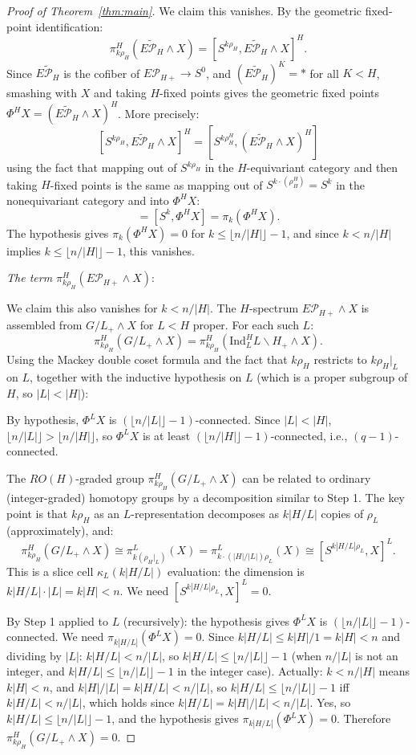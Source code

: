\documentclass[12pt]{article}
\theoremstyle{definition}
\begin{document}
\begin{proof}[Proof of Theorem~\ref{thm:main}]
We claim this vanishes.  By the geometric fixed-point identification:
\[
   \pi_{k\rho_H}^H(\widetilde{E\mathcal{P}_H}\wedge X) = [S^{k\rho_H}, \widetilde{E\mathcal{P}_H}\wedge X]^H.
\]
Since $\widetilde{E\mathcal{P}_H}$ is the cofiber of $E\mathcal{P}_{H+}\to S^0$, and $(\widetilde{E\mathcal{P}_H})^K = *$ for all $K < H$, smashing with $X$ and taking $H$-fixed points gives the geometric fixed points $\Phi^H X = (\widetilde{E\mathcal{P}_H}\wedge X)^H$.  More precisely:
\[
   [S^{k\rho_H}, \widetilde{E\mathcal{P}_H}\wedge X]^H = [S^{k\rho_H^H}, (\widetilde{E\mathcal{P}_H}\wedge X)^H]
\]
using the fact that mapping out of $S^{k\rho_H}$ in the $H$-equivariant category and then taking $H$-fixed points is the same as mapping out of $S^{k\cdot(\rho_H^H)} = S^k$ in the nonequivariant category and into $\Phi^H X$:
\[
   = [S^k, \Phi^H X] = \pi_k(\Phi^H X).
\]
The hypothesis gives $\pi_k(\Phi^H X) = 0$ for $k \leq \lfloor n/|H|\rfloor - 1$, and since $k < n/|H|$ implies $k\leq \lfloor n/|H|\rfloor - 1$, this vanishes.

\noindent\emph{The term $\pi_{k\rho_H}^H(E\mathcal{P}_{H+}\wedge X)$}:

We claim this also vanishes for $k < n/|H|$.  The $H$-spectrum $E\mathcal{P}_{H+}\wedge X$ is assembled from $G/L_+\wedge X$ for $L < H$ proper.  For each such $L$:
\[
   \pi_{k\rho_H}^H(G/L_+\wedge X) = \pi_{k\rho_H}^H(\mathrm{Ind}_L^H L\backslash H_+ \wedge X).
\]
Using the Mackey double coset formula and the fact that $k\rho_H$ restricts to $k\rho_H|_L$ on $L$, together with the inductive hypothesis on $L$ (which is a proper subgroup of $H$, so $|L| < |H|$):

By hypothesis, $\Phi^L X$ is $(\lfloor n/|L|\rfloor - 1)$-connected.  Since $|L| < |H|$, $\lfloor n/|L|\rfloor > \lfloor n/|H|\rfloor$, so $\Phi^L X$ is at least $(\lfloor n/|H|\rfloor - 1)$-connected, i.e., $(q-1)$-connected.

The $RO(H)$-graded group $\pi_{k\rho_H}^H(G/L_+\wedge X)$ can be related to ordinary (integer-graded) homotopy groups by a decomposition similar to Step 1.  The key point is that $k\rho_H$ as an $L$-representation decomposes as $k|H/L|$ copies of $\rho_L$ (approximately), and:
\[
   \pi_{k\rho_H}^H(G/L_+\wedge X) \cong \pi_{k(\rho_H|_L)}^L(X) = \pi_{k \cdot (|H|/|L|) \rho_L}^L(X)
   \cong [S^{k|H/L|\rho_L}, X]^L.
\]
This is a slice cell $\kappa_L(k|H/L|)$ evaluation: the dimension is $k|H/L|\cdot |L| = k|H|< n$.  We need $[S^{k|H/L|\rho_L}, X]^L = 0$.

By Step 1 applied to $L$ (recursively): the hypothesis gives $\Phi^L X$ is $(\lfloor n/|L|\rfloor - 1)$-connected.  We need $\pi_{k|H/L|}(\Phi^L X) = 0$.  Since $k|H/L| \leq k|H|/1 = k|H| < n$ and dividing by $|L|$: $k|H/L| < n/|L|$, so $k|H/L| \leq \lfloor n/|L|\rfloor - 1$ (when $n/|L|$ is not an integer, and $k|H/L| \leq \lfloor n/|L|\rfloor - 1$ in the integer case).  Actually: $k < n/|H|$ means $k|H| < n$, and $k|H|/|L| = k|H/L| < n/|L|$, so $k|H/L| \leq \lfloor n/|L|\rfloor - 1$ iff $k|H/L| < n/|L|$, which holds since $k|H/L| = k|H|/|L| < n/|L|$.  Yes, so $k|H/L| \leq \lfloor n/|L|\rfloor - 1$, and the hypothesis gives $\pi_{k|H/L|}(\Phi^L X) = 0$.  Therefore $\pi_{k\rho_H}^H(G/L_+\wedge X) = 0$.


\end{proof}
\end{document}
